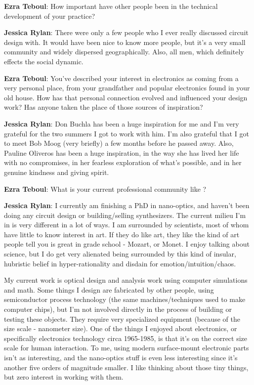 \textbf{Ezra Teboul}: How important have other people been in the technical development of your practice? 

                  
\textbf{Jessica Rylan}: There were only a few people who I ever really discussed circuit design with. It would have been nice to know more people, but it's a very small community and widely dispersed geographically. Also, all men, which definitely effects the social dynamic.

\textbf{Ezra Teboul}: You've described your interest in electronics as coming from a very personal place, from your grandfather and popular electronics found in your old house. How has that personal connection evolved and influenced your design work? Has anyone taken the place of those sources of inspiration? 

\textbf{Jessica Rylan}: Don Buchla has been a huge inspiration for me and I'm very grateful for the two summers I got to work with him. I'm also grateful that I got to meet Bob Moog (very briefly) a few months before he passed away. Also, Pauline Oliveros has been a huge inspiration, in the way she has lived her life with no compromises, in her fearless exploration of what's possible, and in her genuine kindness and giving spirit.

\textbf{Ezra Teboul}: What is your current professional community like ? 

                  
\textbf{Jessica Rylan}: I currently am finishing a PhD in nano-optics, and haven't been doing any circuit design or building/selling synthesizers. The current milieu I'm in is very different in a lot of ways. I am surrounded by scientists, most of whom have little to know interest in art. If they do like art, they like the kind of art people tell you is great in grade school - Mozart, or Monet. I enjoy talking about science, but I do get very alienated being surrounded by this kind of insular, hubristic belief in hyper-rationality and disdain for emotion/intuition/chaos. 

My current work is optical design and analysis work using computer simulations and math. Some things I design are fabricated by other people, using semiconductor process technology (the same machines/techniques used to make computer chips), but I'm not involved directly in the process of building or testing these objects. They require very specialized equipment (because of the size scale - nanometer size). One of the things I enjoyed about electronics, or specifically electronics technology circa 1965-1985, is that it's on the correct size scale for human interaction. To me, using modern surface-mount electronic parts isn't as interesting, and the nano-optics stuff is even less interesting since it's another five orders of magnitude smaller. I like thinking about those tiny things, but zero interest in working with them.

